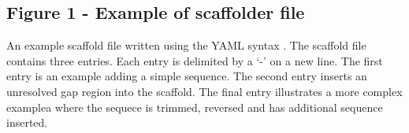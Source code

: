 \documentclass[10pt]{bmc_article}
\newenvironment{bmcformat}{\begin{raggedright}\baselineskip20pt\sloppy\setboolean{publ}{false}}{\end{raggedright}\baselineskip20pt\sloppy}
\begin{document}
\begin{bmcformat}
\subsection*{Figure 1 - Example of scaffolder file}

An example scaffold file written using the YAML syntax \cite{yaml}. The
scaffold file contains three entries. Each entry is delimited by a `-' on a new
line. The first entry is an example adding a simple sequence. The second entry
inserts an unresolved gap region into the scaffold. The final entry illustrates
a more complex examplea where the sequece is trimmed, reversed and has
additional sequence inserted. \pb

\end{bmcformat}
\end{document}
